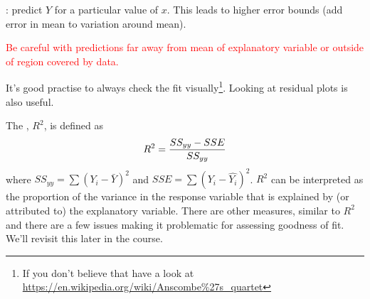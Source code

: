 \begin{definition}[prediction]
	: predict $Y$ for a particular value of $x$. This leads to higher error bounds (add error in mean to variation around mean).
\end{definition}



\textcolor{red}{Be careful with predictions far away from mean of explanatory variable or outside of region covered by data.}

It's good practise to always check the fit visually\footnote{If you don't believe that have a look at \url{https://en.wikipedia.org/wiki/Anscombe\%27s_quartet}}. Looking at residual plots is also useful.

\begin{definition}
	The , $R^2$, is defined as
	\begin{align}
		R^2 = \frac{SS_{yy}-SSE}{SS_{yy}} \notag
	\end{align}
	where $SS_{yy}=\sum(Y_i-\bar{Y})^2$ and $SSE=\sum(Y_i-\hat{Y_i})^2$. $R^2$ can be interpreted as the proportion of the variance in the response variable that is explained by (or attributed to) the explanatory variable. There are other measures, similar to $R^2$ and there are a few issues making it problematic for assessing goodness of fit. We'll revisit this later in the course.
\end{definition}
